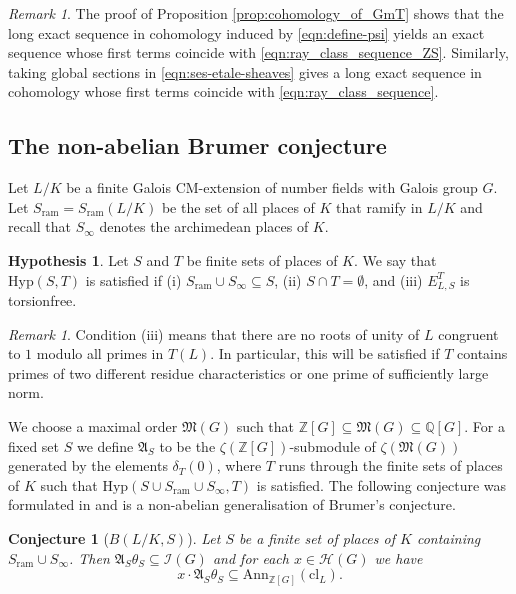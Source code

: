 \documentclass[12pt]{amsart}
\theoremstyle{plain}
\newtheorem{conj}[theorem]{Conjecture}
\theoremstyle{remark}
\newtheorem{remark}[theorem]{Remark}
\theoremstyle{definition}
\newtheorem*{hypothesis*}{Hypothesis}
\numberwithin{equation}{section}
\begin{document}
{\begin{remark}
The proof of Proposition \ref{prop:cohomology_of_GmT} shows that the long exact sequence in cohomology induced by \eqref{eqn:define-psi} 
yields an exact sequence whose first terms coincide with \eqref{eqn:ray_class_sequence_ZS}. 
Similarly, taking global sections in \eqref{eqn:ses-etale-sheaves} gives a long exact sequence
in cohomology whose first terms coincide with \eqref{eqn:ray_class_sequence}.
\end{remark}

\subsection{The non-abelian Brumer conjecture}\label{subsec:non-abelian-Brumer}
Let $L/K$ be a finite Galois CM-extension of number fields with Galois group $G$.
Let $S_{\mathrm{ram}}=S_{\mathrm{ram}}(L/K)$ be the set of all places of $K$ that ramify in $L/K$
and recall that $S_{\infty}$ denotes the archimedean places of $K$.
\begin{hypothesis*}
Let $S$ and $T$ be finite sets of places of $K$. 
We say that ${\mathrm{Hyp}}(S,T)$ is satisfied if
(i)
$S_{\mathrm{ram}} \cup S_{\infty} \subseteq S$,
(ii)
$S \cap T = \emptyset$, and
(iii)
$E_{L,S}^T$ is torsionfree.
\end{hypothesis*}

\begin{remark}\label{rmk:conditions-on-T}
Condition (iii) means that there are no roots of unity of $L$ congruent to $1$ modulo all primes in $T(L)$. 
In particular, this will be satisfied if $T$ contains primes of two different residue characteristics or one prime of sufficiently large norm. 
\end{remark}

We choose a maximal order $\mathfrak{M}(G)$ such that ${\mathbb{Z}}[G] \subseteq \mathfrak{M}(G) \subseteq {\mathbb{Q}}[G]$.
For a fixed set $S$ we define $\mathfrak{A}_{S}$ to be the $\zeta({\mathbb{Z}}[G])$-submodule of $\zeta(\mathfrak{M}(G))$ generated
by the  elements $\delta_T(0)$, where $T$ runs through the finite sets of places of $K$
such that ${\mathrm{Hyp}}(S \cup S_{\mathrm{ram}} \cup S_{\infty},T)$ is satisfied.
The following conjecture was formulated in \cite{MR2976321} and is a non-abelian generalisation of Brumer's conjecture.

\begin{conj}[$B(L/K,S)$] \label{conj:Brumer}
Let $S$ be a finite set of places of $K$ containing $S_{\mathrm{ram}} \cup S_{\infty}$.
Then $\mathfrak{A}_S \theta_S \subseteq \mathcal{I}(G)$ and for each $x \in \mathcal H(G)$ we have
\[
x \cdot \mathfrak{A}_S \theta_S \subseteq {\mathrm{Ann}}_{{\mathbb{Z}}[G]} ({\mathrm{cl}}_L).
\]
\end{conj}

}
\end{document}

